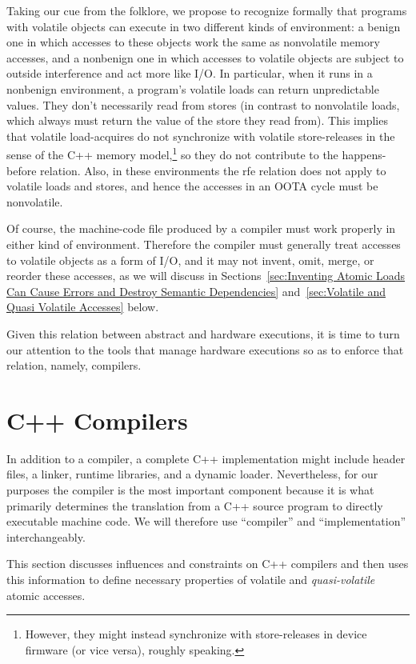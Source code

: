Taking our cue from the folklore, we propose to recognize formally
that programs with volatile objects can execute in two different kinds
of environment: a benign one in which accesses to these objects work
the same as nonvolatile memory accesses, and a nonbenign one in which
accesses to volatile objects are subject to outside interference and
act more like I/O.
In particular, when it runs in a nonbenign environment, a program's
volatile loads can return unpredictable values.
They don't necessarily read from stores (in contrast to nonvolatile loads,
which always must return the value of the store they read from).
This implies that volatile load-acquires do not synchronize with
volatile store-releases in the sense of the C++ memory model,\footnote{
	However, they might instead synchronize with store-releases in
	device firmware (or vice versa), roughly speaking.}
so they do not contribute to the happens-before relation.
Also, in these environments the rfe relation does not apply to volatile
loads and stores, and hence the accesses in an OOTA cycle must be nonvolatile.

Of course, the machine-code file produced by a compiler must work
properly in either kind of environment.
Therefore the compiler must generally treat accesses to volatile objects
as a form of I/O, and it may not
invent, omit, merge, or reorder these accesses, as we will discuss in
Sections~\ref{sec:Inventing Atomic Loads Can Cause Errors and Destroy Semantic Dependencies}
and~\ref{sec:Volatile and Quasi Volatile Accesses} below.

Given this relation between abstract and hardware executions, it is time
to turn our attention to the tools that manage hardware executions so as
to enforce that relation, namely, compilers.

\section{C++ Compilers}
\label{sec:C++ Compilers}

In addition to a compiler, a complete C++ implementation might include
 header files, a linker, runtime libraries, and a dynamic loader.
Nevertheless, for our purposes the compiler is the most important
component because it is what primarily determines the translation from
a C++ source program to directly executable machine code.
We will therefore use ``compiler'' and ``implementation'' interchangeably.

This section discusses influences and constraints on C++ compilers
and then uses this information to define necessary properties of
volatile and \emph{quasi-volatile} atomic accesses.

